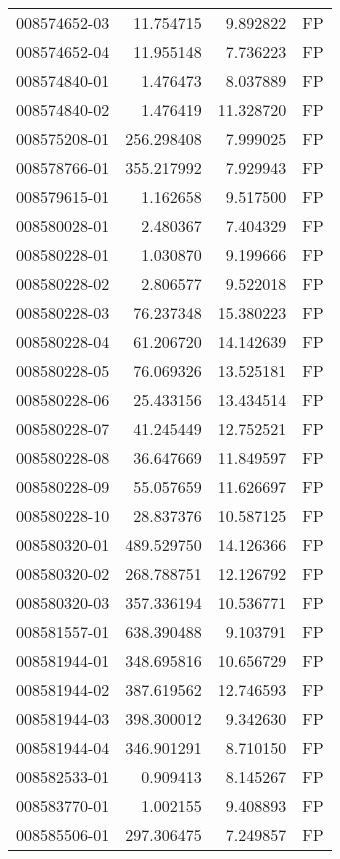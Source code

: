 \begin{tabular}{lrrl}
008574652-03 &   11.754715 &     9.892822 &   FP \\
008574652-04 &   11.955148 &     7.736223 &   FP \\
008574840-01 &    1.476473 &     8.037889 &   FP \\
008574840-02 &    1.476419 &    11.328720 &   FP \\
008575208-01 &  256.298408 &     7.999025 &   FP \\
008578766-01 &  355.217992 &     7.929943 &   FP \\
008579615-01 &    1.162658 &     9.517500 &   FP \\
008580028-01 &    2.480367 &     7.404329 &   FP \\
008580228-01 &    1.030870 &     9.199666 &   FP \\
008580228-02 &    2.806577 &     9.522018 &   FP \\
008580228-03 &   76.237348 &    15.380223 &   FP \\
008580228-04 &   61.206720 &    14.142639 &   FP \\
008580228-05 &   76.069326 &    13.525181 &   FP \\
008580228-06 &   25.433156 &    13.434514 &   FP \\
008580228-07 &   41.245449 &    12.752521 &   FP \\
008580228-08 &   36.647669 &    11.849597 &   FP \\
008580228-09 &   55.057659 &    11.626697 &   FP \\
008580228-10 &   28.837376 &    10.587125 &   FP \\
008580320-01 &  489.529750 &    14.126366 &   FP \\
008580320-02 &  268.788751 &    12.126792 &   FP \\
008580320-03 &  357.336194 &    10.536771 &   FP \\
008581557-01 &  638.390488 &     9.103791 &   FP \\
008581944-01 &  348.695816 &    10.656729 &   FP \\
008581944-02 &  387.619562 &    12.746593 &   FP \\
008581944-03 &  398.300012 &     9.342630 &   FP \\
008581944-04 &  346.901291 &     8.710150 &   FP \\
008582533-01 &    0.909413 &     8.145267 &   FP \\
008583770-01 &    1.002155 &     9.408893 &   FP \\
008585506-01 &  297.306475 &     7.249857 &   FP \\

\end{tabular}

